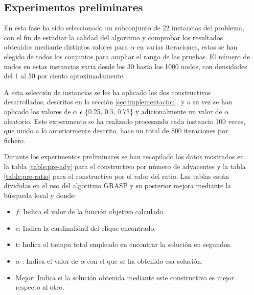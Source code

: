 \subsection{Experimentos preliminares}
En esta fase ha sido seleccionado un subconjunto de 22 instancias del problema, con el fin de estudiar la calidad del algoritmo y comprobar los resultados obtenidos mediante distintos valores para $\alpha$ en varias iteraciones, estas se han elegido de todos los conjuntos para ampliar el rango de las pruebas. El número de nodos en estas instancias varia desde los 30 hasta los 1000 nodos, con densidades del 1 al 50 por ciento aproximadamente.

A esta selección de instancias se les ha aplicado los dos constructivos desarrollados, descritos en la sección \ref{sec:implementacion}, y a su vez se han aplicado los valores de $\alpha$ $\epsilon$ \{0.25, 0.5, 0.75\} y adicionalmente un valor de $\alpha$ aleatorio.
Este experimento se ha realizado procesando cada instancia 100 veces, que unido a lo anteriormente descrito, hace un total de 800 iteraciones por fichero.

Durante los experimentos preliminares se han recopilado los datos mostrados en la tabla \ref{table:pre-ady} para el constructivo por número de adyacentes y la tabla \ref{table:pre-ratio} para el constructivo por el valor del ratio. Las tablas están divididas en el uso del algoritmo \gls{GRASP} y su posterior mejora mediante la búsqueda local y donde:

\begin{itemize}
	\item $f$: Indica el valor de la función objetivo calculado.
	\item c: Indica la cardinalidad del clique encontrado.
	\item t: Indica el tiempo total empleado en encontrar la solución en segundos.
	\item $\alpha$ : Indica el valor de $\alpha$ con el que se ha obtenido esa solución.
	\item Mejor: Indica si la solución obtenida mediante este constructivo es mejor respecto al otro.
\end{itemize}

